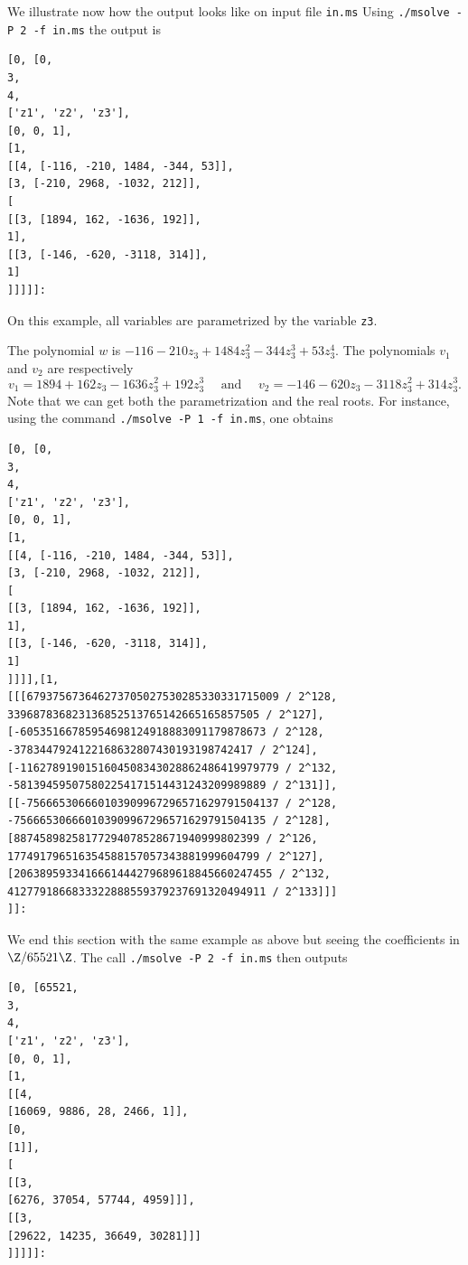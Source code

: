 \documentclass[a4paper,english,11pt]{scrartcl}
\theoremstyle{definition}
\theoremstyle{remark}
\begin{document}
We illustrate now how the output looks like on input file \verb+in.ms+
Using \verb+./msolve -P 2 -f in.ms+ the output is
\begin{tcolorbox} %
  \begin{lstlisting}
[0, [0,
3,
4,
['z1', 'z2', 'z3'],
[0, 0, 1],
[1,
[[4, [-116, -210, 1484, -344, 53]],
[3, [-210, 2968, -1032, 212]],
[
[[3, [1894, 162, -1636, 192]],
1],
[[3, [-146, -620, -3118, 314]],
1]
]]]]]:
  \end{lstlisting}
\end{tcolorbox}
On this example, all variables are parametrized by the variable \verb+z3+.

The polynomial $w$ is $-116 - 210 z_3 + 1484 z_3^2 -344 z_3^3 + 53 z_3^4$.
The polynomials $v_1$ and $v_2$ are respectively
\[
    v_1 = 1894 + 162 z_3 - 1636 z_3^2 + 192 z_3^3 \quad \text{ and }
    \quad v_2 = -146 -620 z_3 - 3118 z_3^2 + 314 z_3^3.
\]
Note that we can get both the parametrization and the real roots.
For instance, using the command
\verb+./msolve -P 1 -f in.ms+, one obtains
\begin{tcolorbox} %
  \begin{lstlisting}
[0, [0,
3,
4,
['z1', 'z2', 'z3'],
[0, 0, 1],
[1,
[[4, [-116, -210, 1484, -344, 53]],
[3, [-210, 2968, -1032, 212]],
[
[[3, [1894, 162, -1636, 192]],
1],
[[3, [-146, -620, -3118, 314]],
1]
]]]],[1,
[[[679375673646273705027530285330331715009 / 2^128, 339687836823136852513765142665165857505 / 2^127], [-60535166785954698124918883091179878673 / 2^128, -3783447924122168632807430193198742417 / 2^124], [-1162789190151604508343028862486419979779 / 2^132, -581394595075802254171514431243209989889 / 2^131]], [[-756665306660103909967296571629791504137 / 2^128, -756665306660103909967296571629791504135 / 2^128], [88745898258177294078528671940999802399 / 2^126, 177491796516354588157057343881999604799 / 2^127], [2063895933416661444279689618845660247455 / 2^132, 4127791866833322888559379237691320494911 / 2^133]]]
]]:
  \end{lstlisting}
\end{tcolorbox}

We end this section with the same example as above but seeing the coefficients in
\(\Z/65521\Z\).
The call \verb+./msolve -P 2 -f in.ms+ then outputs
\begin{tcolorbox} %
  \begin{lstlisting}
[0, [65521,
3,
4,
['z1', 'z2', 'z3'],
[0, 0, 1],
[1,
[[4,
[16069, 9886, 28, 2466, 1]],
[0,
[1]],
[
[[3,
[6276, 37054, 57744, 4959]]],
[[3,
[29622, 14235, 36649, 30281]]]
]]]]]:
  \end{lstlisting}
\end{tcolorbox}
\end{document}
